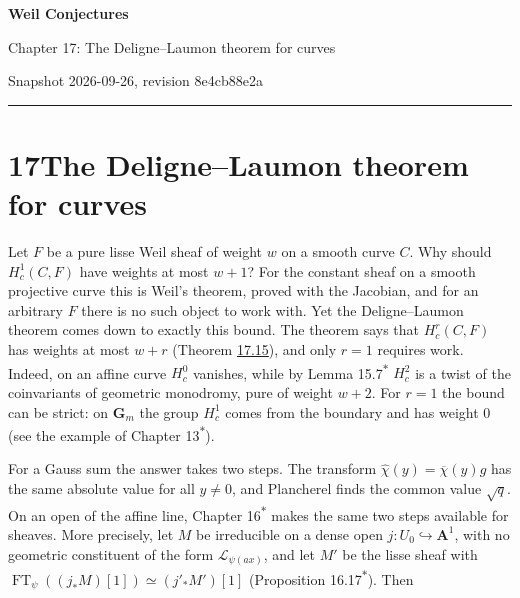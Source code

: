 \documentclass[11pt]{article}
\newcommand{\bpout}[1]{#1\textsuperscript{\hyperlink{bp-outside}{\ensuremath{\ast}}}}
\begin{document}
\pagestyle{plain}
\begin{center}
{\LARGE\bfseries Weil Conjectures\par}
\vspace{0.7em}
{\large Chapter 17: The Deligne–Laumon theorem for curves\par}
\vspace{0.5em}
{\small\color{bpmuted}Snapshot 2026-09-26, revision 8e4cb88e2a\par}
\end{center}
\vspace{0.5em}
{\small\tableofcontents}
\bigskip\hrule\bigskip

\section*{\texorpdfstring{17\quad The Deligne–Laumon theorem for curves}{17 The Deligne–Laumon theorem for curves}}
\label{bp1}%
\label{bp2}%
Let \(F\) be a pure lisse Weil sheaf of weight \(w\) on a smooth curve \(C\). Why should \(H^1_c(C,F)\) have weights at most \(w+1\)? For the constant sheaf on a smooth projective curve this is Weil's theorem, proved with the Jacobian, and for an arbitrary \(F\) there is no such object to work with. Yet the Deligne–Laumon theorem comes down to exactly this bound. The theorem says that \(H^r_c(C,F)\) has weights at most \(w+r\) (Theorem \hyperref[bp47]{17.15}), and only \(r=1\) requires work. Indeed, on an affine curve \(H^0_c\) vanishes, while by Lemma \bpout{15.7} \(H^2_c\) is a twist of the coinvariants of geometric monodromy, pure of weight \(w+2\). For \(r=1\) the bound can be strict: on \(\mathbf G_m\) the group \(H^1_c\) comes from the boundary and has weight \(0\) (see the example of Chapter \bpout{13}).

For a Gauss sum the answer takes two steps. The transform \(\hat\chi(y)=\overline\chi(y)g\) has the same absolute value for all \(y\ne0\), and Plancherel finds the common value \(\sqrt q\). On an open of the affine line, Chapter \bpout{16} makes the same two steps available for sheaves. More precisely, let \(M\) be irreducible on a dense open \(j:U_0\hookrightarrow\mathbf A^1\), with no geometric constituent of the form \(\mathcal L_{\psi(ax)}\), and let \(M'\) be the lisse sheaf with \(\operatorname{FT}_\psi((j_*M)[1])\simeq(j'_*M')[1]\) (Proposition \bpout{16.17}). Then
\end{document}
